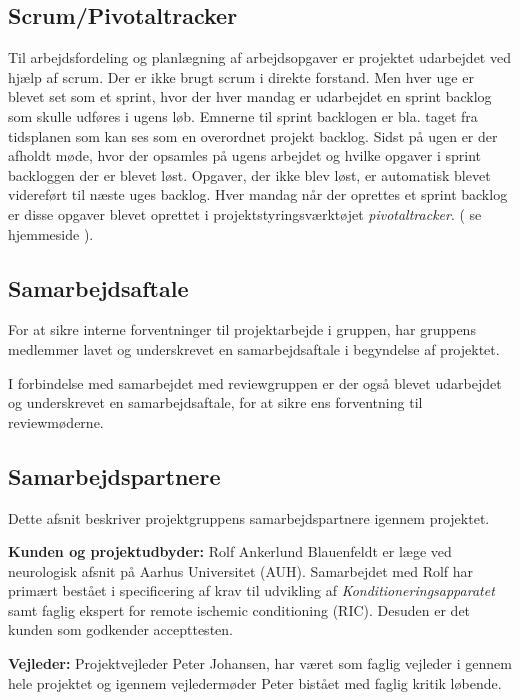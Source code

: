 \subsection{Scrum/Pivotaltracker} \label{title:scrum}
Til arbejdsfordeling og planlægning af arbejdsopgaver er projektet udarbejdet ved hjælp af scrum. Der er ikke brugt scrum i direkte forstand. Men hver uge er blevet set som et sprint, hvor der hver mandag er udarbejdet en sprint backlog som skulle udføres i ugens løb. Emnerne til sprint backlogen er bla. taget fra tidsplanen som kan ses som en overordnet projekt backlog. Sidst på ugen er der afholdt møde, hvor der opsamles på ugens arbejdet og hvilke opgaver i sprint backloggen der er blevet løst. Opgaver, der ikke blev løst, er automatisk blevet videreført til næste uges backlog. Hver mandag når der oprettes et sprint backlog er disse opgaver blevet oprettet i projektstyringsværktøjet \textit{pivotaltracker}. ( se hjemmeside ). 

\subsection{Samarbejdsaftale}
For at sikre interne forventninger til projektarbejde i gruppen, har gruppens medlemmer lavet og underskrevet en samarbejdsaftale i begyndelse af projektet. 

I forbindelse med samarbejdet med reviewgruppen er der også blevet udarbejdet og underskrevet en samarbejdsaftale, for at sikre ens forventning til reviewmøderne. 

\subsection{Samarbejdspartnere} \label{title:samarbejdspartnere}
Dette afsnit beskriver projektgruppens samarbejdspartnere igennem projektet. 

\textbf{Kunden og projektudbyder:} Rolf Ankerlund Blauenfeldt er læge ved neurologisk afsnit på Aarhus Universitet (AUH). Samarbejdet med Rolf har primært bestået i specificering af krav til udvikling af \textit{Konditioneringsapparatet} samt faglig ekspert for remote ischemic conditioning (RIC). Desuden er det kunden som godkender accepttesten.

\textbf{Vejleder:} Projektvejleder Peter Johansen, har været som faglig vejleder i gennem hele projektet og igennem vejledermøder Peter bistået med faglig kritik løbende. 

